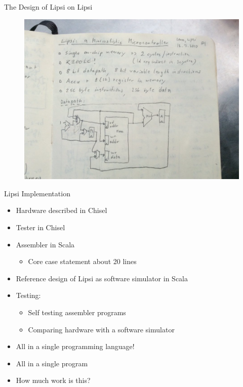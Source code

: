 \documentclass[xcolor=pdflatex,dvipsnames,table]{beamer}
\begin{document}
\begin{frame}[fragile]{The Design of Lipsi on Lipsi}
\begin{figure}
    \centering
    \includegraphics[scale=0.3]{lipsi}
\end{figure}
\end{frame}

\begin{frame}[fragile]{Lipsi Implementation}
\begin{itemize}
\item Hardware described in Chisel
\item Tester in Chisel
\item Assembler in Scala
\begin{itemize}
\item Core case statement about 20 lines
\end{itemize}
\item Reference design of Lipsi as software simulator in Scala
\item Testing:
\begin{itemize}
\item Self testing assembler programs
\item Comparing hardware with a software simulator
\end{itemize}
\item All in a single programming language!
\item All in a single program
\item How much work is this?
\end{itemize}
\end{frame}
\end{document}

